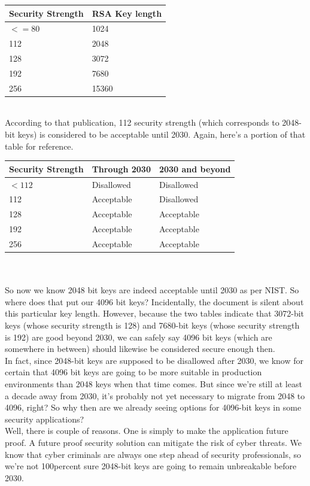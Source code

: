 \begin{tabular}{ |p{3cm}||p{3cm}|  }

	\hline
	Security Strength & RSA Key length \\
	\hline
	$<=80 $           & 1024           \\
	112               & 2048           \\
	128               & 3072           \\
	192               & 7680           \\
	256               & 15360          \\
	\hline
\end{tabular}
\\
According to that publication, 112 security strength (which corresponds to 2048-bit keys) is considered to be acceptable until 2030. Again, here's a portion of that table for reference.\\

\begin{tabular}{ |p{3cm}||p{3cm}|p{3cm}|  }

	\hline
	Security Strength & Through 2030 & 2030 and beyond \\
	\hline
	$<112 $           & Disallowed   & Disallowed      \\
	112               & Acceptable   & Disallowed      \\
	128               & Acceptable   & Acceptable      \\
	192               & Acceptable   & Acceptable      \\
	256               & Acceptable   & Acceptable      \\
	\hline
\end{tabular}
\\
\\
So now we know 2048 bit keys are indeed acceptable until 2030 as per NIST.
So where does that put our 4096 bit keys? Incidentally, the document is
silent about this particular key length. However, because the two tables
indicate that 3072-bit keys (whose security strength is 128) and 7680-bit
keys (whose security strength is 192) are good beyond 2030, we can safely
say 4096 bit keys (which are somewhere in between)
should likewise be considered secure enough then.\\
In fact, since 2048-bit keys are supposed to be disallowed after 2030, we
know for certain that 4096 bit keys are going to be more suitable in
production environments than 2048 keys when that time comes. But since
we're still at least a decade away from 2030, it's probably not yet
necessary to migrate from 2048 to 4096, right?
So why then are we already seeing options for 4096-bit keys in some security applications?\\
Well, there is  couple of reasons. One is simply to make the application
future proof. A future proof security solution can mitigate the risk of
cyber threats. We know that cyber criminals are always one step ahead of
security professionals, so we're not 100percent sure 2048-bit keys are going to
remain unbreakable before 2030. \cite{barker2016nist}

